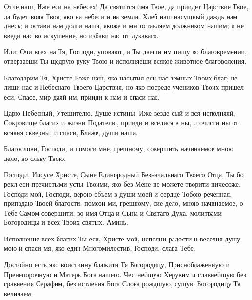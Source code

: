 Oтче наш, Иже еси на небесех! Да святится имя Твое, да приидет Царствие Твое, да будет воля Твоя, яко на небеси и на земли. Хлеб наш насущный даждь нам днесь; и остави нам долги наша, якоже и мы оставляем должником нашим; и не введи нас во искушение, но избави нас от лукаваго.


\itshape 


Или:\normalfont{} Очи всех на Тя, Господи, уповают, и Ты даеши им пищу во благовремении, отверзаеши Ты щедрую руку Твою и исполняеши всякое животное благоволения.
\mychapterending

 


Благодарим Тя, Христе Боже наш, яко насытил еси нас земных Твоих благ; не лиши нас и Небеснаго Твоего Царствия, но яко посреде учеников Твоих пришел еси, Спасе, мир даяй им, прииди к нам и спаси нас.
\mychapterending

 



Царю Небесный, Утешителю, Душе истины, Иже везде сый и вся исполняяй, Сокровище благих и жизни Подателю, прииди и вселися в ны, и очисти ны от всякия скверны, и спаси, Блаже, души наша.


    Благослови, Господи, и помоги мне, грешному, совершить начинаемое мною дело, во славу Твою.


    Господи, Иисусе Христе, Сыне Единородный Безначальнаго Твоего Отца, Ты бо рекл еси пречистыми усты Твоими, яко без Мене не можете творити ничесоже. Господи мой, Господи, верою объем в души моей и сердце Тобою реченная, припадаю Твоей благости: помози ми, грешному, сие дело, мною начинаемое, о Тебе Самом совершити, во имя Отца и Сына и Святаго Духа, молитвами Богородицы и всех Твоих святых. Аминь.
\mychapterending

 



Исполнение всех благих Ты еси, Христе мой, исполни радости и веселия душу мою и спаси мя, яко един Многомилостив, Господи, слава Тебе.


Достойно есть яко воистинну блажити Тя Богородицу, Присноблаженную и Пренепорочную и Матерь Бога нашего. Честнейшую Херувим и славнейшую без сравнения Серафим, без истления Бога Слова рождшую, сущую Богородицу Тя величаем.
\mychapterending

